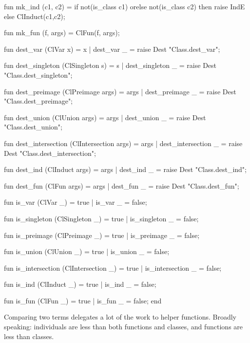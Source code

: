 fun mk_ind (c1, c2) =
  if not(is_class c1) orelse not(is_class c2)
  then raise IndE
  else ClInduct(c1,c2);

fun mk_fun (f, args) = ClFun(f, args);

fun dest_var (ClVar x) = x
  | dest_var _ = raise Dest "Class.dest_var";

fun dest_singleton (ClSingleton s) = s
  | dest_singleton _ = raise Dest "Class.dest_singleton";

fun dest_preimage (ClPreimage args) = args
  | dest_preimage _ = raise Dest "Class.dest_preimage";

fun dest_union (ClUnion args) = args
  | dest_union _ = raise Dest "Class.dest_union";

fun dest_intersection (ClIntersection args) = args
  | dest_intersection _ = raise Dest "Class.dest_intersection";

fun dest_ind (ClInduct args) = args
  | dest_ind _ = raise Dest "Class.dest_ind";

fun dest_fun (ClFun args) = args
  | dest_fun _ = raise Dest "Class.dest_fun";

fun is_var (ClVar _) = true
  | is_var _ = false;

fun is_singleton (ClSingleton _) = true
  | is_singleton _ = false;

fun is_preimage (ClPreimage _) = true
  | is_preimage _ = false;

fun is_union (ClUnion _) = true
  | is_union _ = false;

fun is_intersection (ClIntersection _) = true
  | is_intersection _ = false;

fun is_ind (ClInduct _) = true
  | is_ind _ = false;

fun is_fun (ClFun _) = true
  | is_fun _ = false;
end
\nwendcode{}\nwdocspar

\begin{node}
Comparing two terms delegates a lot of the work to helper
functions. Broadly speaking: individuals are less than both functions
and classes, and functions are less than classes.
\end{node}

